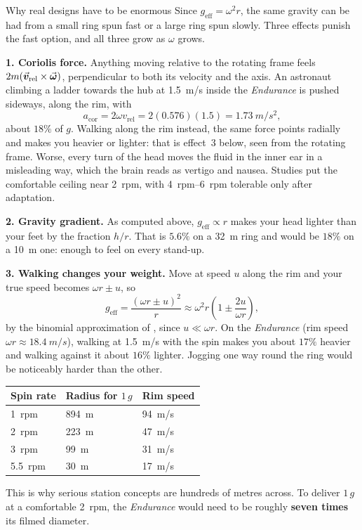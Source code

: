 \begin{remarkbox}{Why real designs have to be enormous}
Since $g_{\text{eff}}=\omega^{2}r$, the same gravity can be had from a small ring spun fast or a large
ring spun slowly. Three effects punish the fast option, and all three grow as $\omega$ grows.

\medskip
\textbf{1. Coriolis force.} Anything moving relative to the rotating frame feels
$2m(\vec{\bm{v}}_{\text{rel}}\times\vec{\bm{\omega}})$, perpendicular to both its velocity and the axis. An astronaut
climbing a ladder towards the hub at \SI{1.5}{m/s} inside the \emph{Endurance} is pushed sideways,
along the rim, with
\[
a_{\text{cor}}=2\omega v_{\text{rel}}=2(0.576)(1.5)=\SI{1.73}{m/s^2},
\]
about $18\%$ of $g$. Walking along the rim instead, the same force points radially and makes you
heavier or lighter: that is effect~3 below, seen from the rotating frame. Worse, every turn of the head
moves the fluid in the inner
ear in a misleading way, which the brain reads as vertigo and nausea. Studies put the comfortable
ceiling near \SI{2}{rpm}, with \SIrange{4}{6}{rpm} tolerable only after adaptation.

\medskip
\textbf{2. Gravity gradient.} As computed above, $g_{\text{eff}}\propto r$ makes your head lighter than
your feet by the fraction $h/r$. That is $5.6\%$ on a \SI{32}{m} ring and would be $18\%$ on a
\SI{10}{m} one: enough to feel on every stand-up.

\medskip
\textbf{3. Walking changes your weight.} Move at speed $u$ along the rim and your true speed becomes
$\omega r\pm u$, so
\[
g_{\text{eff}}=\frac{(\omega r\pm u)^{2}}{r}\approx\omega^{2}r\left(1\pm\frac{2u}{\omega r}\right),
\]
by the binomial approximation of , since $u\ll\omega r$.
On the \emph{Endurance} (rim speed $\omega r\approx\SI{18.4}{m/s}$), walking at \SI{1.5}{m/s} with
the spin makes you about $17\%$ heavier and walking against it about $16\%$ lighter. Jogging one way
round the ring would be noticeably harder than the other.

\medskip
\begin{center}
\begin{tabular}{@{}lll@{}}
\toprule
Spin rate & Radius for $1\,g$ & Rim speed\\
\midrule
\SI{1}{rpm}   & \SI{894}{m} & \SI{94}{m/s}\\
\SI{2}{rpm}   & \SI{223}{m} & \SI{47}{m/s}\\
\SI{3}{rpm}   & \SI{99}{m}  & \SI{31}{m/s}\\
\SI{5.5}{rpm} & \SI{30}{m}  & \SI{17}{m/s}\\
\bottomrule
\end{tabular}
\end{center}

\medskip
This is why serious station concepts are hundreds of metres across. To deliver $1\,g$ at a
comfortable \SI{2}{rpm}, the \emph{Endurance} would need to be roughly \textbf{seven times} its filmed
diameter.
\end{remarkbox}

